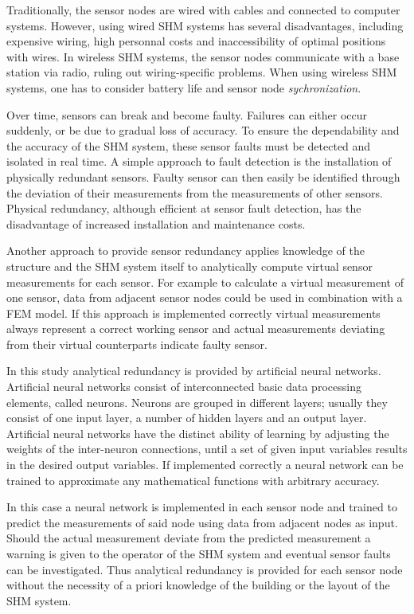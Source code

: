 \documentclass[12pt]{scrartcl}
\begin{document}
Traditionally, the sensor nodes are wired with cables and connected to computer systems.
However, using wired SHM systems has several disadvantages, including expensive wiring, high personnal costs and inaccessibility of optimal positions with wires.
In wireless SHM systems, the sensor nodes communicate with a base station via radio, ruling out wiring-specific problems.
When using wireless SHM systems, one has to consider battery life and sensor node \textit{sychronization}.

Over time, sensors can break and become faulty. Failures can either occur suddenly, or be due to gradual loss of accuracy.
To ensure the dependability and the accuracy of the SHM system, these sensor faults must be detected and isolated in real time. 
A simple approach to fault detection is the installation of physically redundant sensors.
Faulty sensor can then easily be identified through the deviation of their measurements from the measurements of other sensors.
Physical redundancy, although efficient at sensor fault detection, has the disadvantage of increased installation and maintenance costs.

Another approach to provide sensor redundancy applies knowledge of the structure and the SHM system itself to analytically compute virtual sensor measurements for each sensor.
For example to calculate a virtual measurement of one sensor, data from adjacent sensor nodes could be used in combination with a FEM model.
If this approach is implemented correctly virtual measurements always represent a correct working sensor and actual measurements deviating from their virtual counterparts indicate faulty sensor.\cite{SmarslyDA}

In this study analytical redundancy is provided by artificial neural networks.
Artificial neural networks consist of interconnected basic data processing elements, called neurons. 
Neurons are grouped in different layers; usually they consist of one input layer, a number of hidden layers and an output layer.
Artificial neural networks have the distinct ability of learning by adjusting the weights of the inter-neuron connections, until a set of given input variables results in the desired output variables.
If implemented correctly a neural network can be trained to approximate any mathematical functions with arbitrary accuracy.

In this case a neural network is implemented in each sensor node and trained to predict the measurements of said node using data from adjacent nodes as input. 
Should the actual measurement deviate from the predicted measurement a warning is given to the operator of the SHM system and eventual sensor faults can be investigated.
Thus analytical redundancy is provided for each sensor node without the necessity of a priori knowledge of the building or the layout of the SHM system.
\end{document}
